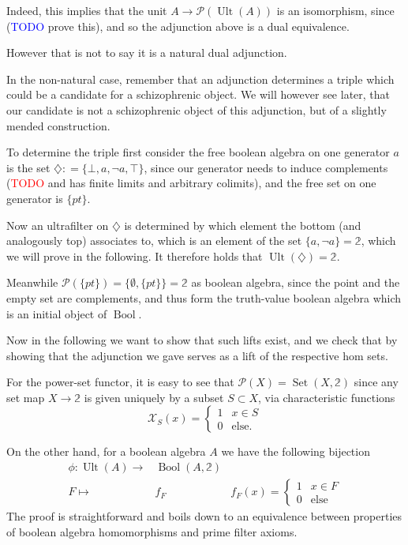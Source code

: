 \documentclass[12pt,a4paper]{article}
\DeclareMathOperator{\Set}{Set}
\DeclareMathOperator{\Bool}{Bool}
\DeclareMathOperator{\Ult}{Ult}
\begin{document}
Indeed, this implies that the unit $A \to \mathcal{P}(\Ult(A))$ is an isomorphism, since (\textcolor{blue}{TODO} prove this), and so the adjunction above is a dual equivalence.

However that is not to say it is a natural dual adjunction. 

In the non-natural case, remember that an adjunction determines a triple which could be a candidate for a schizophrenic object. We will however see later, that our candidate is not a schizophrenic object of this adjunction, but of a slightly mended construction.

To determine the triple first consider the free boolean algebra on one generator $a$ is the set $\diamondsuit : =\{\bot, a, \neg a, \top \}$, since our generator needs to induce complements (\textcolor{red}{TODO} and has finite limits and arbitrary colimits), and the free set on one generator is $\{pt\}$. 

Now  an ultrafilter on $\diamondsuit$ is determined by which element the bottom (and analogously top) associates to, which is an element of the set $\{a, \neg a\}= \mathbb{2}$, which we will prove in the following. It  therefore holds that  $\Ult(\diamondsuit) = \mathbb{2}$.

Meanwhile $\mathcal{P}(\{pt\}) = \{\emptyset, \{pt\}\} = \mathbb{2}$ as boolean algebra, since the point and the empty set are complements, and thus form the truth-value boolean algebra which is an initial object of $\Bool$. 

 Now in the following we want to show that such lifts exist, and we check that by showing that the adjunction we gave serves as a lift of the respective hom sets. 
 
For the power-set functor, it is easy to see that $\mathcal{P}(X) = \Set(X, \mathbb{2}) $ since any set map  $X \to \mathbb{2}$ is given uniquely by a subset $ S \subset X$, via characteristic functions \begin{equation*}
  \mathcal{X}_{ S}(x) = \begin{cases}
   1 & x \in  S \\
    0 & \text{else}.
  \end{cases}
\end{equation*}

On the other hand, for a boolean algebra $A$ we have the following bijection \begin{align*}
  	\phi: \Ult(A) \to& \Bool(A, \mathbb{2})\\
  	F \mapsto& f_F &f_F(x) = \begin{cases}
   1 & x \in F \\
    0 & \text{else}
  \end{cases}
  \end{align*}
The proof is straightforward and boils down to an equivalence between properties of boolean algebra homomorphisms and prime filter axioms. 
\end{document}
